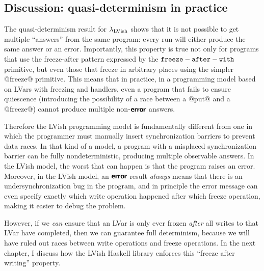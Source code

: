 \subsection{Discussion: quasi-determinism in practice}


The quasi-determinism result for $\lambda_{\textrm{LVish}}$ shows that it is not
possible to get multiple ``answers'' from the same program: every run
will either produce the same answer or an error.  Importantly, this
property is true not only for programs that use the freeze-after
pattern expressed by the ${\mbox{\texttt{freeze}}-\mbox{\texttt{after}}-\mbox{\texttt{with}}}$ primitive, but even those that freeze
in arbitrary places using the simpler @freeze@ primitive.  This means
that in practice, in a programming model based on LVars with freezing
and handlers, even a program that fails to ensure quiescence
(introducing the possibility of a race between a @put@ and a
@freeze@) cannot produce multiple non-$\textbf{\textsf{error}}$ answers.

Therefore the LVish programming model is fundamentally different from
one in which the programmer must manually insert synchronization
barriers to prevent data races.  In that kind of a model, a program
with a misplaced synchronization barrier can be fully
nondeterministic, producing multiple observable answers.  In the LVish
model, the worst that can happen is that the program raises an error.
Moreover, in the LVish model, an $\textbf{\textsf{error}}$ result \emph{always} means
that there is an undersynchronization bug in the program, and in
principle the error message can even specify exactly which write
operation happened after which freeze operation, making it easier to
debug the problem.

However, if we \emph{can} ensure that an LVar is only ever frozen
\emph{after} all writes to that LVar have completed, then we can
guarantee full determinism, because we will have ruled out races
between write operations and freeze operations.  In the next chapter,
I discuss how the LVish Haskell library enforces this ``freeze after
writing'' property.
